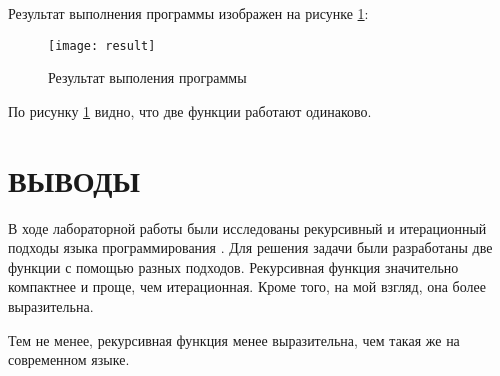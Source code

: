 \documentclass[a4paper,14pt]{extarticle}
\begin{document}
Результат выполнения программы изображен на рисунке \ref{fig:result}:

\begin{figure}
    \centering
    \texttt{[image: result]}
    \caption{Результат выполения программы}
    \label{fig:result}
\end{figure}

По рисунку \ref{fig:result} видно, что две функции работают одинаково.

\section*{ВЫВОДЫ}
В ходе лабораторной работы были исследованы рекурсивный и итерационный подходы
языка программирования . Для решения задачи были разработаны две
функции с помощью разных подходов. Рекурсивная функция значительно компактнее и
проще, чем итерационная. Кроме того, на мой взгляд, она более выразительна.

Тем не менее, рекурсивная функция менее выразительна, чем такая же на
современном языке.
\end{document}
